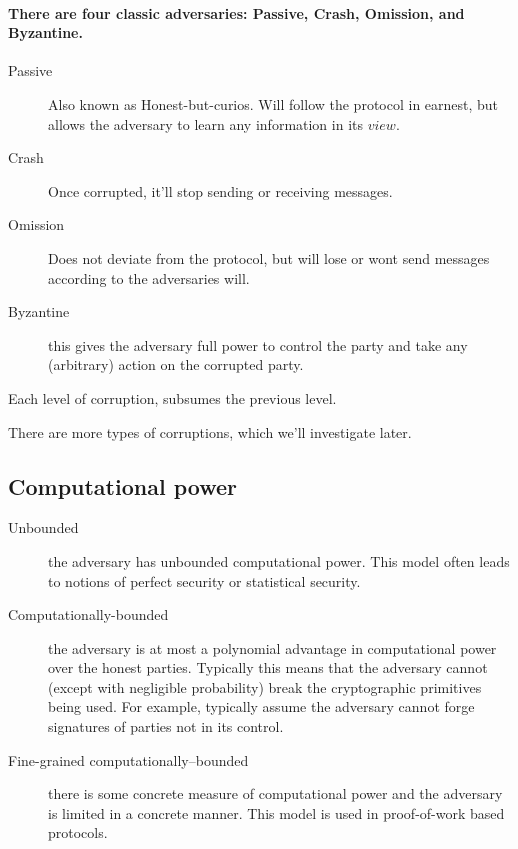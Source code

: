 \paragraph{There are four classic adversaries: Passive, Crash, Omission, and
Byzantine.}
\begin{description}
\item [{Passive}] Also known as Honest-but-curios. Will follow the protocol
in earnest, but allows the adversary to learn any information in its
$view$.
\item [{Crash}] Once corrupted, it'll stop sending or receiving messages.
\item [{Omission}] Does not deviate from the protocol, but will lose or
wont send messages according to the adversaries will.
\item [{Byzantine}] this gives the adversary full power to control the
party and take any (arbitrary) action on the corrupted party.
\end{description}
\begin{rem}
Each level of corruption, subsumes the previous level.
\end{rem}

\begin{rem}
There are more types of corruptions, which we'll investigate later.
\end{rem}


\subsection{Computational power}
\begin{description}
\item [{Unbounded}] the adversary has unbounded computational power. This
model often leads to notions of perfect security or statistical security.
\item [{Computationally-bounded}] the adversary is at most a polynomial
advantage in computational power over the honest parties. Typically
this means that the adversary cannot (except with negligible probability)
break the cryptographic primitives being used. For example, typically
assume the adversary cannot forge signatures of parties not in its
control.
\item [{Fine-grained$\,\,$computationally--bounded}] there is some concrete
measure of computational power and the adversary is limited in a concrete
manner. This model is used in proof-of-work based protocols.
\end{description}

